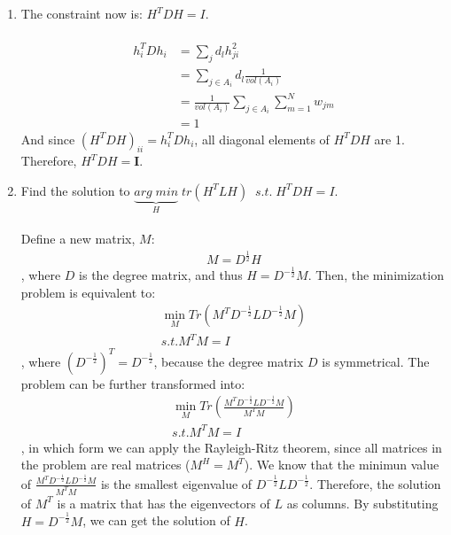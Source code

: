 \documentclass[11pt]{article}
\newcommand{\mtx}[1]{\mathbf{#1}}
\def \mI {\mtx{I}}
\begin{document}
\begin{enumerate}
	
	\item The constraint now is: $H^TDH=I$.\\ \\
	\begin{equation}
		\begin{aligned}
			h_i^TDh_i &= \sum_{j}d_lh_{ji}^2\\
			&= \sum_{j\in A_i} d_l \frac{1}{vol(A_i)}\\
			&= \frac{1}{vol(A_i)} \sum_{j\in A_i} \sum_{m=1}^N w_{jm}\\
			&= 1
		\end{aligned}
	\end{equation}
	And since $(H^TDH)_{ii}=h_i^TDh_i$, all diagonal elements of $H^TDH$ are 1. Therefore, $H^TDH=\mI$.
	 
	\item Find the solution to $\underbrace{arg\;min}_H\; tr(H^TLH) \;\; s.t.\;H^TDH=I$.\\ \\
	Define a new matrix, $M$:
	\begin{equation}
		\begin{aligned}
			M=D^{\frac{1}{2}}H
		\end{aligned}
	\end{equation}
, where $D$ is the degree matrix, and thus $H=D^{-\frac{1}{2}}M$.
	Then, the minimization problem is equivalent to:
	\begin{equation}
		\begin{aligned}
			\min_{M} Tr(M^TD^{-\frac{1}{2}}LD^{-\frac{1}{2}}M)\\
			s.t. M^TM=I
		\end{aligned}
	\end{equation}
	, where $(D^{-\frac{1}{2}})^T=D^{-\frac{1}{2}}$, because the degree matrix $D$ is symmetrical. The problem can be further transformed into:
	\begin{equation}
		\begin{aligned}
			\min_{M} Tr(\frac{M^TD^{-\frac{1}{2}}LD^{-\frac{1}{2}}M}{M^TM})\\
			s.t. M^TM=I
		\end{aligned}
	\end{equation}
, in which form we can apply the Rayleigh-Ritz theorem, since all matrices in the problem are real matrices ($M^H=M^T$). We know that the minimun value of $\frac{M^TD^{-\frac{1}{2}}LD^{-\frac{1}{2}}M}{M^TM}$ is the smallest eigenvalue of $D^{-\frac{1}{2}}LD^{-\frac{1}{2}}$. Therefore, the solution of $M^T$ is a matrix that has the eigenvectors of $L$ as columns. By substituting $H=D^{-\frac{1}{2}}M$, we can get the solution of $H$.
	
\end{enumerate}
\end{document}
